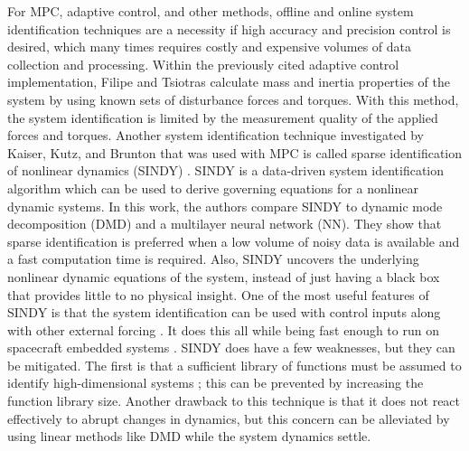 \documentclass[letterpaper, preprint, paper,11pt]{AAS}	%
\begin{document}
For MPC, adaptive control, and other methods, offline and online system identification techniques are a necessity if high accuracy and precision control is desired, which many times requires costly and expensive volumes of data collection and processing. Within the previously cited adaptive control implementation, Filipe and Tsiotras calculate mass and inertia properties of the system by using known sets of disturbance forces and torques. With this method, the system identification is limited by the measurement quality of the applied forces and torques. Another system identification technique investigated by Kaiser, Kutz, and Brunton that was used with MPC is called sparse identification of nonlinear dynamics (SINDY) \cite{KaiserKutz_SINDyMPC}. SINDY is a data-driven system identification algorithm which can be used to derive governing equations for a nonlinear dynamic systems. In this work, the authors compare SINDY to dynamic mode decomposition (DMD) and a multilayer neural network (NN). They show that sparse identification is preferred when a low volume of noisy data is available and a fast computation time is required. Also, SINDY uncovers the underlying nonlinear dynamic equations of the system, instead of just having a black box that provides little to no physical insight. One of the most useful features of SINDY is that the system identification can be used with control inputs along with other external forcing \cite{BruntonProctor_SINDYc}. It does this all while being fast enough to run on spacecraft embedded systems \cite{ProvostBrunton_SINDyAnalysis}. SINDY does have a few weaknesses, but they can be mitigated. The first is that a sufficient library of functions must be assumed to identify high-dimensional systems \cite{KaiserKutz_SINDyMPC}; this can be prevented by increasing the function library size. Another drawback to this technique is that it does not react effectively to abrupt changes in dynamics, but this concern can be alleviated by using linear methods like DMD while the system dynamics settle.
\end{document}
